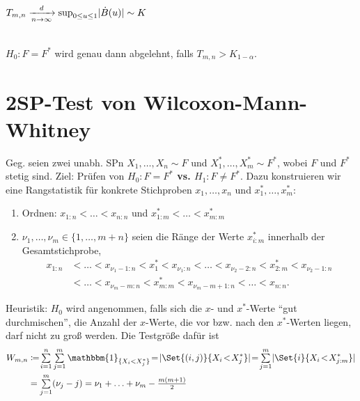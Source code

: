 \documentclass{cheat-sheet}
\newcommand{\ind}{\mathbbm{1}} %
\newcommand{\testh}[1]{\textcolor{TestColor}{\textbf{#1}}}
\begin{document}
\begin{lem}
  $T_{m,n} \xrightarrow[n \to \infty]{d} \sup_{0 \leq u \leq 1} \lvert\dot{B}(u)\rvert \sim K$
\end{lem}

\begin{entscheidungsregel} \mbox{}\\
  $H_0 : F = F^*$ wird genau dann abgelehnt, falls $T_{m,n} > K_{1-\alpha}$.
\end{entscheidungsregel}

\section{2SP-Test von Wilcoxon-Mann-Whitney} %



\begin{situation}
  Geg. seien zwei unabh. SPn $X_1, \ldots, X_n \sim F$ und $X_1^{*}, \ldots, X_m^{*} \sim F^{*}$, wobei $F$ und $F^*$ stetig sind.
  Ziel: Prüfen von \testh{$H_0 : F = F^{*}$ vs. $H_1 : F \neq F^{*}$}.
  Dazu konstruieren wir eine Rangstatistik für konkrete Stichproben $x_1, \ldots, x_n$ und $x_1^{*}, \ldots, x_m^{*}$:
  \begin{enumerate}
    \item Ordnen: $x_{1:n} < \ldots < x_{n:n}$ und $x_{1:m}^{*} < \ldots < x_{m:m}^{*}$
    \item $\nu_1, \ldots, \nu_m \in \{ 1, \ldots, m+n \}$ seien die Ränge der Werte $x_{i:m}^{*}$ innerhalb der Gesamtstichprobe, \dh{}
    \begin{align*}
      x_{1:n} & \!<\! \ldots \!<\! x_{\nu_1 - 1:n} \!<\! x_1^{*} \!<\! x_{\nu_1:n} \!<\! \ldots \!<\! x_{\nu_2 - 2:n} \!<\! x_{2:m}^{*} < x_{\nu_2 - 1:n} \\
      & < \ldots < x_{\nu_m-m:n} < x_{m:m}^{*} < x_{\nu_m - m + 1 : n} < \ldots < x_{n:n}.
    \end{align*}
  \end{enumerate}
  Heuristik: $H_0$ wird angenommen, falls sich die $x$- und $x^{*}$-Werte "`gut durchmischen"', \dh{} die Anzahl der $x$-Werte, die vor bzw. nach den $x^{*}$-Werten liegen, darf nicht zu groß werden.
  Die Testgröße dafür ist
  \begin{align*}
    W_{m,n} & \coloneqq \! \sum_{i=1}^n \sum_{j=1}^m \ind_{\{ X_i < X_j^{*} \}} \!=\! \abs{\Set{(i, j)}{ X_i \!<\! X_j^{*}}} \!=\! \sum_{j=1}^m \abs{\Set{i}{X_i \!<\! X_{j:m}^{*}}} \\
    & = \sum_{j=1}^m (\nu_j - j) = \nu_1 + \ldots + \nu_m - \tfrac{m (m+1)}{2}
  \end{align*}
\end{situation}
\end{document}
